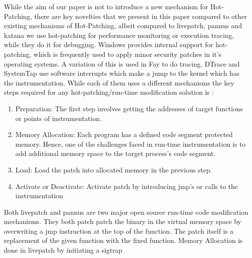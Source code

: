 While the aim of our paper is not to introduce a new mechanism for Hot-Patching, 
there are key novelties that we present in this paper compared to other existing 
mechanisms of Hot-Patching, albeit compared to livepatch, pannus and katana \cite{livepatch, pannus, 
katana} we use hot-patching for performance monitoring or execution tracing, while they do it for 
debugging. Windows provides internal support for hot-patching, which is 
frequently used to apply minor security patches in it's operating systems\cite{windows_sec}. 
A variation of this is used in Fay\cite{fay} to do tracing. DTrace and SystemTap \cite{dtrace,systemtap} 
use software interrupts which make a jump to the kernel which has the 
instrumentation. While each of them uses a different mechanisms the key steps required for any hot-patching/run-time modification solution is :

\begin{enumerate}
  \item Preparation: 
  The first step involves getting the addresses of target functions or points of instrumentation.  
  \item Memory Allocation: 
 Each program has a defined code segment protected memory. Hence, one of the 
 challenges faced in run-time instrumentation is to add additional 
 memory space to the target process's code segment. 
  \item Load: 
  Load the patch into allocated memory in the previous step.
  \item Activate or Deactivate: 
  Activate patch by introducing jmp's or calls to the instrumentation
\end{enumerate} 

Both livepatch and pannus are two major open source run-time code modification 
mechanisms. They both patch patch the binary in the virtual memory space by 
overwriting a jmp instruction at the top of the function. 
The patch itself is a replacement of the given function with the fixed function. 
Memory Allocation is done in livepatch by initiating a sigtrap 

